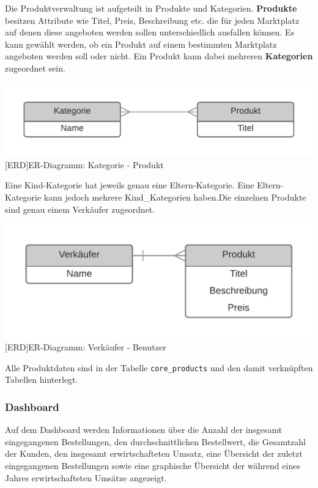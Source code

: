 	Die Produktverwaltung ist aufgeteilt in Produkte und Kategorien. \textbf{Produkte} besitzen Attribute wie Titel, Preis, Beschreibung etc. die für jeden Marktplatz auf denen diese angeboten werden sollen unterschiedlich ausfallen können. Es kann gewählt werden, ob ein Produkt auf einem bestimmten Marktplatz angeboten werden soll oder nicht. Ein Produkt kann dabei mehreren \textbf{Kategorien} zugeordnet sein.\\
	\begin{minipage}{\linewidth}
		\vspace{1em}
		\centering
		\includegraphics[width=0.6\linewidth]{img/ERD_Category_Product}
		[ERD]{ER-Diagramm: Kategorie - Produkt}
		\label{fig:header}
		\vspace{1em}
	\end{minipage}
	Eine Kind-Kategorie hat jeweils genau eine Eltern-Kategorie. Eine Eltern-Kategorie kann jedoch mehrere Kind\_Kategorien haben.Die  einzelnen Produkte sind genau einem Verkäufer zugeordnet. \\
	\begin{minipage}{\linewidth}
		\vspace{1em}
		\centering
		\includegraphics[width=0.6\linewidth]{img/ERD_Seller_Product}
		[ERD]{ER-Diagramm: Verkäufer - Benutzer}
		\label{fig:header}
		\vspace{1em}
	\end{minipage}
	
	Alle Produktdaten sind in der Tabelle \texttt{core\_products} und den damit verknüpften Tabellen hinterlegt.
	
	\subsubsection{Dashboard}
	
	Auf dem Dashboard werden Informationen über die Anzahl der insgesamt eingegangenen Bestellungen, den durchschnittlichen Bestellwert, die Gesamtzahl der Kunden, den insgesamt erwirtschafteten Umsatz, eine Übersicht der zuletzt eingegangenen Bestellungen sowie eine graphische Übersicht der während eines Jahres erwirtschafteten Umsätze angezeigt. 
	
